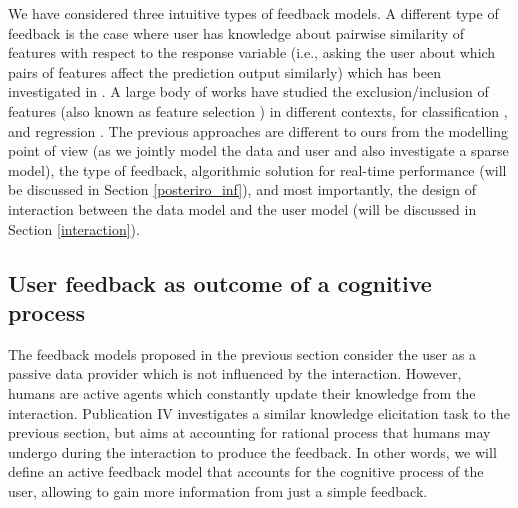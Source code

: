 \documentclass[dissertation,math,vertlayout,pdfa,colorlinks]{aaltoseries}
\begin{document}
We have considered three intuitive types of feedback models. %
A different type of feedback is the case where user has knowledge about pairwise similarity of features with respect to the response variable (i.e., asking the user about which  pairs of features affect the prediction output similarly) which has been investigated in \cite{Homayun_pairwise_UMAP,Homayun_pairwise_ijcai2019}. A large body of works have studied the exclusion/inclusion of features (also known as feature selection \cite{Correia2019HumanintheLoopFS}) in different contexts, for classification  \cite{druck2009active,raghavan2006active,settles2011closing}, and regression \cite{Micallef_elicitation}. %
The previous approaches are different to ours from the modelling point of view (as we jointly model the data and user and also investigate a sparse model), the type of feedback, algorithmic solution for real-time performance (will be discussed in Section \ref{posteriro_inf}), and most importantly, the design of interaction between the data model and the user model (will be discussed in Section \ref{interaction}).

\subsection{User feedback as outcome of a cognitive process}

The feedback models proposed in the previous section consider the user as a passive data provider which is not influenced by the interaction. However, humans are active agents which constantly update their knowledge from the interaction. Publication IV investigates a similar knowledge elicitation task to the previous section, but aims at accounting for rational process that humans may undergo during the interaction to produce the feedback. In other words, we will define an active feedback model that accounts for the cognitive process of the user, allowing to gain more information from just a simple feedback.
\end{document}
